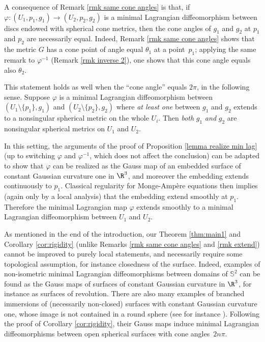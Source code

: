 \begin{remark}\label{rmk extend}
A consequence of Remark \ref{rmk same cone angles} is that, if $\varphi:(U_1,p_1,g_1)\to (U_2,p_2,g_2)$ is a minimal Lagrangian diffeomorphism between discs endowed with spherical cone metrics, then the cone angles of $g_1$ and $g_2$ at $p_1$ and $p_2$ are necessarily equal. Indeed, Remark \ref{rmk same cone angles} shows that the metric $G$ has a cone point of angle equal $\theta_1$ at a point~$p_1$; applying the same remark to $\varphi^{-1}$ (Remark \ref{rmk inverse 2}), one shows that this cone angle equals also $\theta_2$.

This statement holds as well when the ``cone angle'' equals $2\pi$, in the following sense. Suppose $\varphi$ is a minimal Lagrangian diffeomorphism between $(U_1\setminus\{p_1\},g_1)$ and $(U_2\setminus\{p_2\},g_2)$ where \emph{at least one} between $g_1$ and $g_2$ extends to a nonsingular spherical metric on the whole $U_i$. Then \emph{both} $g_1$ \emph{and} $g_2$ are nonsingular spherical metrics on $U_1$ and $U_2$.

In this setting, the arguments of the proof of Proposition \ref{lemma realize min lag} (up to switching $\varphi$ and $\varphi^{-1}$, which does not affect the conclusion) can be adapted to show that $\varphi$ can be realized as the Gauss map of an embedded surface of constant Gaussian curvature one in $\R^3$, and moreover the embedding extends continuously to $p_1$. Classical regularity for Monge-Ampère equations then implies (again only by a local analysis) that the embedding extend smoothly at $p_1$. Therefore the minimal Lagrangian map $\varphi$ extends smoothly to a minimal Lagrangian diffeomorphism between $U_1$ and $U_2$.
\end{remark}

\begin{remark}
As mentioned in the end of the introduction, our Theorem \ref{thm:main1} and Corollary \ref{cor:rigidity} (unlike Remarks \ref{rmk same cone angles} and \ref{rmk extend}) cannot be improved to purely local statements, and necessarily require some topological assumption, for instance closedness of the surface. Indeed, examples of non-isometric minimal Lagrangian diffeomorphisms between domains of $\mathbb S^2$ can be found as the Gauss maps of surfaces of constant Gaussian curvature in $\R^3$, for instance as surfaces of revolution. There are also many examples of branched immersions of (necessarily non-closed) surfaces with constant Gaussian curvature one, whose image is not contained in a round sphere (see for instance \cite{zbMATH06599450}). Following the proof of Corollary \ref{cor:rigidity}, their Gauss maps induce minimal Lagrangian diffeomorphisms between open spherical surfaces with cone angles~$2n\pi$.
\end{remark}

